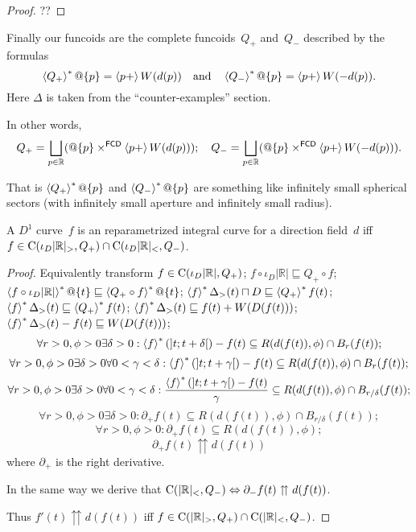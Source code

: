 \begin{proof}
??
\end{proof}

Finally our funcoids are the complete funcoids~$Q_+$ and~$Q_-$ described by the formulas
\[
\left\langle Q_+\right\rangle ^{\ast}@\{p\} = \left\langle p+\right\rangle W(d(p)) \quad\text{and}\quad \left\langle Q_-\right\rangle ^{\ast}@\{p\} = \left\langle p+\right\rangle W(-d(p)).
\]
Here $\Delta$ is taken from the ``counter-examples'' section.

In other words,
\[
Q_+ = \bigsqcup_{p\in\mathbb{R}} (@\{p\}\times^{\mathsf{FCD}}\supfun{p+}{W(d(p))});
\quad
Q_- = \bigsqcup_{p\in\mathbb{R}} (@\{p\}\times^{\mathsf{FCD}}\supfun{p+}{W(-d(p))}).
\]

That is $\left\langle Q_+\right\rangle ^{\ast}@\{p\}$ and $\left\langle Q_-\right\rangle ^{\ast}@\{p\}$ are something like infinitely small spherical sectors
(with infinitely small aperture and infinitely small radius).


\begin{thm}
A $D^1$ curve~$f$ is an reparametrized integral curve for a direction field~$d$ iff
$f\in\mathrm{C}(\iota_D|\mathbb{R}|_{>},Q_+)\cap\mathrm{C}(\iota_D|\mathbb{R}|_{<},Q_-)$.
\end{thm}

\begin{proof}
Equivalently transform $f\in\mathrm{C}(\iota_D|\mathbb{R}|,Q_+)$; $f\circ \iota_D|\mathbb{R}|\sqsubseteq Q_+\circ f$;
$\left\langle f\circ \iota_D|\mathbb{R}|\right\rangle ^{\ast}@\{t\}\sqsubseteq \left\langle Q_+\circ f\right\rangle ^{\ast}@\{t\}$;
$\left\langle f\right\rangle ^{\ast}\Delta_{>}(t)\sqcap D\sqsubseteq \left\langle Q_+\right\rangle ^{\ast}f(t)$;
$\left\langle f\right\rangle ^{\ast}\Delta_{>}(t)\sqsubseteq \left\langle Q_+\right\rangle ^{\ast}f(t)$;
$\left\langle f\right\rangle ^{\ast}\Delta_{>}(t)\sqsubseteq f(t)+W(D(f(t)))$;
$\left\langle f\right\rangle ^{\ast}\Delta_{>}(t)-f(t)\sqsubseteq W(D(f(t)))$;
\[ \forall r>0, \phi>0 \exists\delta>0: \left\langle f\right\rangle ^{\ast}(]t;t+\delta[)-f(t)\subseteq R(d(f(t)),\phi) \cap B_r(f(t)); \]
\[ \forall r>0, \phi>0 \exists\delta>0 \forall 0<\gamma<\delta: \left\langle f\right\rangle ^{\ast}(]t;t+\gamma[)-f(t)\subseteq R(d(f(t)),\phi) \cap B_r(f(t)); \]
\[ \forall r>0, \phi>0 \exists\delta>0 \forall 0<\gamma<\delta: \frac{\left\langle f\right\rangle ^{\ast}(]t;t+\gamma[)-f(t)}{\gamma}\subseteq R(d(f(t)),\phi) \cap B_{r/\delta}(f(t)); \]
\[ \forall r>0, \phi>0 \exists\delta>0: \partial_+ f(t)\subseteq R(d(f(t)),\phi) \cap B_{r/\delta}(f(t)); \]
\[ \forall r>0, \phi>0: \partial_+ f(t)\subseteq R(d(f(t)),\phi); \]
\[ \partial_+ f(t) \upuparrows d(f(t)) \]
where $\partial_+$ is the right derivative.

In the same way we derive that $\mathrm{C}(|\mathbb{R}|_{<},Q_-)\Leftrightarrow \partial_- f(t) \upuparrows d(f(t))$.

Thus $f'(t) \upuparrows d(f(t))$ iff $f\in\mathrm{C}(|\mathbb{R}|_{>},Q_+)\cap\mathrm{C}(|\mathbb{R}|_{<},Q_-)$.
\end{proof}

